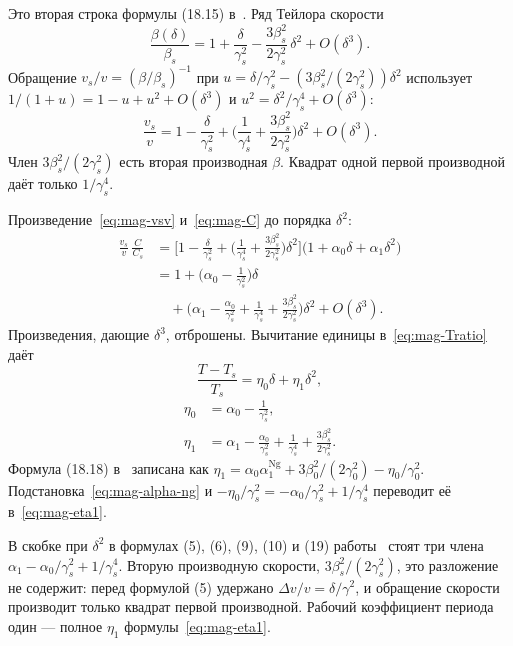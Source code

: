 \documentclass[aps,pra,preprint,a4paper,amsmath,amssymb,longbibliography]{revtex4-2}
\begin{document}
Это вторая строка формулы (18.15) в~\cite{Ng2006}. Ряд Тейлора скорости
\begin{equation}
\label{eq:mag-beta-series}
\frac{\beta(\delta)}{\beta_s}
=1+\frac{\delta}{\gamma_s^2}
-\frac{3\beta_s^2}{2\gamma_s^2}\,\delta^2+O(\delta^3).
\end{equation}
Обращение $v_s/v=(\beta/\beta_s)^{-1}$ при
$u=\delta/\gamma_s^2-(3\beta_s^2/(2\gamma_s^2))\delta^2$
использует $1/(1+u)=1-u+u^2+O(\delta^3)$ и $u^2=\delta^2/\gamma_s^4+O(\delta^3)$:
\begin{equation}
\label{eq:mag-vsv}
\frac{v_s}{v}
=1-\frac{\delta}{\gamma_s^2}
+\Biggl(\frac{1}{\gamma_s^4}+\frac{3\beta_s^2}{2\gamma_s^2}\Biggr)\delta^2
+O(\delta^3).
\end{equation}
Член $3\beta_s^2/(2\gamma_s^2)$ есть вторая производная $\beta$. Квадрат одной первой производной даёт только $1/\gamma_s^4$.

Произведение~\eqref{eq:mag-vsv} и~\eqref{eq:mag-C} до порядка $\delta^2$:
\begin{align}
\frac{v_s}{v}\,\frac{C}{C_s}
&=
\Biggl[1-\frac{\delta}{\gamma_s^2}
+\Biggl(\frac{1}{\gamma_s^4}+\frac{3\beta_s^2}{2\gamma_s^2}\Biggr)\delta^2\Biggr]
\bigl(1+\alpha_0\delta+\alpha_1\delta^2\bigr)
\nonumber\\
&=1+\Biggl(\alpha_0-\frac{1}{\gamma_s^2}\Biggr)\delta
\nonumber\\
&\quad+\Biggl(\alpha_1-\frac{\alpha_0}{\gamma_s^2}
+\frac{1}{\gamma_s^4}+\frac{3\beta_s^2}{2\gamma_s^2}\Biggr)\delta^2
+O(\delta^3).
\label{eq:mag-product}
\end{align}
Произведения, дающие $\delta^3$, отброшены. Вычитание единицы в~\eqref{eq:mag-Tratio} даёт
\begin{equation}
\label{eq:mag-eta-series}
\frac{T-T_s}{T_s}=\eta_0\delta+\eta_1\delta^2,
\end{equation}
\begin{align}
\eta_0&=\alpha_0-\frac{1}{\gamma_s^2},
\label{eq:mag-eta0}\\
\eta_1&=\alpha_1-\frac{\alpha_0}{\gamma_s^2}
+\frac{1}{\gamma_s^4}+\frac{3\beta_s^2}{2\gamma_s^2}.
\label{eq:mag-eta1}
\end{align}
Формула (18.18) в~\cite{Ng2006} записана как $\eta_1=\alpha_0\alpha_1^{\mathrm{Ng}}+3\beta_0^2/(2\gamma_0^2)-\eta_0/\gamma_0^2$. Подстановка~\eqref{eq:mag-alpha-ng} и $-\eta_0/\gamma_s^2=-\alpha_0/\gamma_s^2+1/\gamma_s^4$ переводит её в~\eqref{eq:mag-eta1}.

В скобке при $\delta^2$ в формулах (5), (6), (9), (10) и (19) работы~\cite{Senichev2013} стоят три члена $\alpha_1-\alpha_0/\gamma_s^2+1/\gamma_s^4$. Вторую производную скорости, $3\beta_s^2/(2\gamma_s^2)$, это разложение не содержит: перед формулой (5) удержано $\Delta v/v=\delta/\gamma^2$, и обращение скорости производит только квадрат первой производной. Рабочий коэффициент периода один --- полное $\eta_1$ формулы~\eqref{eq:mag-eta1}.
\end{document}
